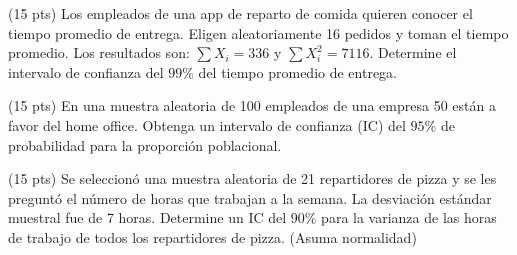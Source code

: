 \documentclass[addpoints]{exam}
\theoremstyle{mytheor}
\begin{document}
\begin{questions}
\question (15 pts) Los empleados de una app de reparto de comida quieren conocer el tiempo promedio de entrega. Eligen aleatoriamente 16 pedidos y toman el tiempo promedio. Los resultados son: $\sum X_i = 336$ y $\sum X_i^2 = 7116$. Determine el intervalo de confianza del $99\%$ del tiempo promedio de entrega.

\question (15 pts) En una muestra aleatoria de 100 empleados de una empresa 50 están a favor del home office. Obtenga un intervalo de confianza (IC) del $95\%$ de probabilidad para la proporción poblacional.

\question (15 pts) Se seleccionó una muestra aleatoria de 21 repartidores de pizza y se les preguntó el número de horas que trabajan a la semana. La desviación estándar muestral fue de 7 horas. Determine un IC del $90\%$ para la varianza de las horas de trabajo de todos los repartidores de pizza. (Asuma normalidad)

\end{questions}
\end{document}
